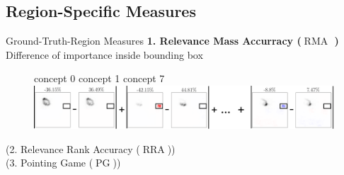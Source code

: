 \documentclass[German, aspectratio=169]{beamer}
\DeclareMathOperator*{\RMA}{RMA}
\DeclareMathOperator*{\RRA}{RRA}
\DeclareMathOperator*{\PG}{PG}
\begin{document}
\subsection{Region-Specific Measures}
\begin{frame}[t]{Ground-Truth-Region Measures}
    \textbf{1. Relevance Mass Accurracy ($\RMA$ \cite{Arras2022} )} \\
    Difference of importance inside bounding box
    \vspace{-0.4cm}
    \begin{figure}
        \centering
        concept 0 \hspace{2.5cm} concept 1 \hspace{3.7cm} concept 7\\
        \includegraphics[width=\textwidth]{images/bbox_diff.png}
        \label{fig:bbox_diff}
    \end{figure}
    (2. Relevance Rank Accuracy ($\RRA$))\\
    (3. Pointing Game ($\PG$))
\end{frame}
\end{document}

